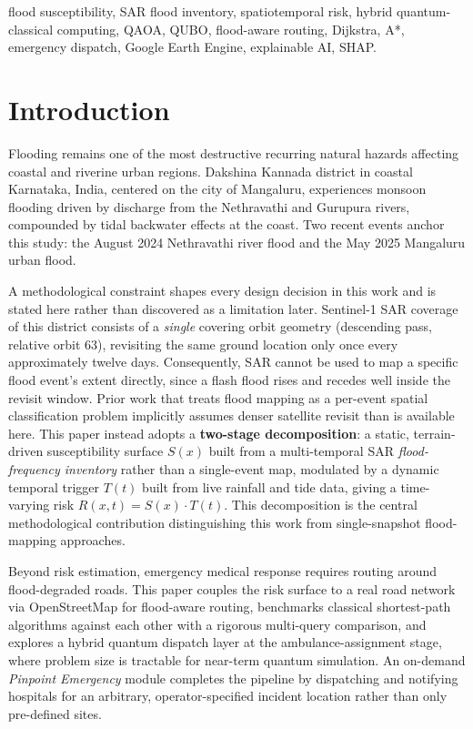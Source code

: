 \documentclass[conference]{IEEEtran}
\begin{document}
\begin{IEEEkeywords}
flood susceptibility, SAR flood inventory, spatiotemporal risk, hybrid quantum-classical computing, QAOA, QUBO, flood-aware routing, Dijkstra, A*, emergency dispatch, Google Earth Engine, explainable AI, SHAP.
\end{IEEEkeywords}

\section{Introduction}
\label{sec:intro}

Flooding remains one of the most destructive recurring natural hazards affecting coastal and riverine urban regions. Dakshina Kannada district in coastal Karnataka, India, centered on the city of Mangaluru, experiences monsoon flooding driven by discharge from the Nethravathi and Gurupura rivers, compounded by tidal backwater effects at the coast. Two recent events anchor this study: the August 2024 Nethravathi river flood and the May 2025 Mangaluru urban flood.

A methodological constraint shapes every design decision in this work and is stated here rather than discovered as a limitation later. Sentinel-1 SAR coverage of this district consists of a \emph{single} covering orbit geometry (descending pass, relative orbit 63), revisiting the same ground location only once every approximately twelve days. Consequently, SAR cannot be used to map a specific flood event's extent directly, since a flash flood rises and recedes well inside the revisit window. Prior work that treats flood mapping as a per-event spatial classification problem implicitly assumes denser satellite revisit than is available here. This paper instead adopts a \textbf{two-stage decomposition}: a static, terrain-driven susceptibility surface $S(x)$ built from a multi-temporal SAR \emph{flood-frequency inventory} rather than a single-event map, modulated by a dynamic temporal trigger $T(t)$ built from live rainfall and tide data, giving a time-varying risk $R(x,t) = S(x)\cdot T(t)$. This decomposition is the central methodological contribution distinguishing this work from single-snapshot flood-mapping approaches.

Beyond risk estimation, emergency medical response requires routing around flood-degraded roads. This paper couples the risk surface to a real road network via OpenStreetMap for flood-aware routing, benchmarks classical shortest-path algorithms against each other with a rigorous multi-query comparison, and explores a hybrid quantum dispatch layer at the ambulance-assignment stage, where problem size is tractable for near-term quantum simulation. An on-demand \emph{Pinpoint Emergency} module completes the pipeline by dispatching and notifying hospitals for an arbitrary, operator-specified incident location rather than only pre-defined sites.
\end{document}
